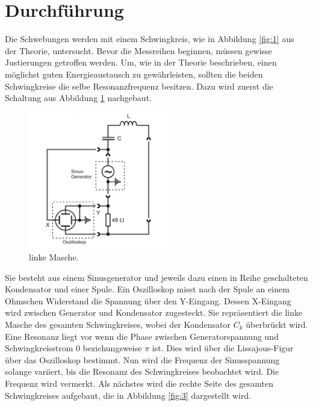\section{Durchführung}
\label{sec:Durchführung}








Die Schwebungen werden mit einem Schwingkreis, wie in Abbildung \ref{fig:1} aus der Theorie, untersucht.
Bevor die Messreihen beginnen, müssen gewisse Justierungen getroffen werden.
Um, wie in der Theorie beschrieben, einen möglichst guten Energieaustausch zu gewährleisten, sollten die beiden Schwingkreise die selbe Resonanzfrequenz besitzen.
Dazu wird zuerst die Schaltung aus Abbildung \ref{fig:2} nachgebaut.

\begin{figure}[H]
  \centering
  \includegraphics[height=6cm]{just1.png}
  \caption{linke Masche. \cite{sample}}
  \label{fig:2}
\end{figure}

Sie besteht aus einem Sinusgenerator und jeweils dazu einen in Reihe geschalteten Kondensator und einer Spule.
Ein Oszilloskop misst nach der Spule an einem Ohmschen Widerstand die Spannung über den Y-Eingang.
Dessen X-Eingang wird zwischen Generator und Kondensator zugesteckt.
Sie repräsentiert die linke Masche des gesamten Schwingkreises, wobei der Kondensator $C_k$ überbrückt wird.\\
Eine Resonanz liegt vor wenn die Phase zwischen Generatorspannung und Schwingkreisstrom 0 beziehungsweise $\pi$ ist.
Dies wird über die Lissajous-Figur über das Oszilloskop bestimmt.
Nun wird die Frequenz der Sinusspannung solange variiert, bis die Resonanz des Schwingkreises beobachtet wird.
Die Frequenz wird vermerkt.
Als nächstes wird die rechte Seite des gesamten Schwingkreises aufgebaut, die in Abbildung \ref{fig:3} dargestellt wird.

